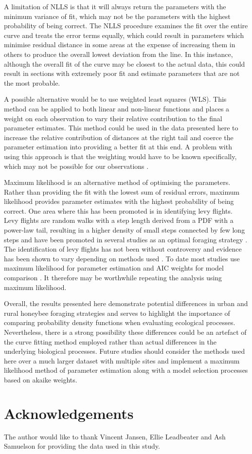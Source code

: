 \documentclass[11pt]{article}
\begin{document}
\begin{linenumbers}
A limitation of NLLS is that it will always return the parameters with the minimum variance of fit, which may not be the parameters with the highest probability of being correct. The NLLS procedure examines the fit over the entire curve and treats the error terms equally, which could result in parameters which minimise residual distance in some areas at the expense of increasing them in others to produce the overall lowest deviation from the line. In this instance, although the overall fit of the curve may be closest to the actual data, this could result in sections with extremely poor fit and estimate parameters that are not the most probable.\par 

A possible alternative would be to use weighted least squares (WLS). This method can be applied to both linear and non-linear functions and places a weight on each observation to vary their relative contribution to the final parameter estimates. This method could be used in the data presented here to increase the relative contribution of distances at the right tail and coerce the parameter estimation into providing a better fit at this end. A problem with using this approach is that the weighting would have to be known specifically, which may not be possible for our observations \citep{Makarenkov2004}.\par

Maximum likelihood is an alternative method of optimising the parameters. Rather than providing the fit with the lowest sum of residual errors, maximum likelihood provides parameter estimates with the highest probability of being correct. One area where this has been promoted is in identifying levy flights. Levy flights are random walks with a step length derived from a PDF with a power-law tail, resulting in a higher density of small steps connected by few long steps and have been promoted in several studies as an optimal foraging strategy \citep{Reynolds2009}. The identification of levy flights has not been without controversy and evidence has been shown to vary depending on methods used \citep{Clauset, Murphy2007}. To date most studies use maximum likelihood for parameter estimation and AIC weights for model comparison \citep{Humphries2010}. It therefore may be worthwhile repeating the analysis using maximum likelihood.\par

Overall, the results presented here demonstrate potential differences in urban and rural honeybee foraging strategies and serves to highlight the importance of comparing probability density functions when evaluating ecological processes. Nevertheless, there is a strong possibility these differences could be an artefact of the curve fitting method employed rather than actual differences in the underlying biological processes. Future studies should consider the methods used here over a much larger dataset with multiple sites and implement a maximum likelihood method of parameter estimation along with a model selection processes based on akaike weights.
\end{linenumbers}
\section{Acknowledgements}
The author would like to thank Vincent Jansen, Ellie Leadbeater and Ash Samuelson for providing the data used in this study.



\end{document}
